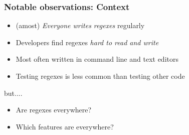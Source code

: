 

\begin{frame}
\frametitle{Notable observations: Context}

\begin{block}{}
\begin{itemize}
	\item  (amost) {\em Everyone writes regexes} regularly 
	\item Developers find regexes {\em hard to read and write}
	\item Most often written in command line and text editors
	\item Testing regexes is {less} common than testing other code
\end{itemize}
\end{block}

but....

\begin{block}{}
\begin{itemize}
\item Are regexes everywhere?
\item Which features are everywhere?
\end{itemize}
\end{block}



\end{frame}









